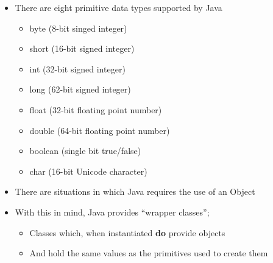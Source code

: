 \documentclass{beamer}
\begin{document}
\begin{frame}

\begin{itemize}
\item There are eight primitive data types supported by Java

\begin{itemize}
\item byte (8-bit singed integer)
\item short (16-bit signed integer)
\item int (32-bit signed integer)
\item long (62-bit signed integer)
\item float (32-bit floating point number)
\item double (64-bit floating point number)
\item boolean (single bit true/false)
\item char (16-bit Unicode character)
\end{itemize}
\end{itemize}

\end{frame}

\begin{frame}[fragile]

\begin{itemize}
\item There are situations in which Java requires the use of an Object
\item With this in mind, Java provides ``wrapper classes'';

\begin{itemize}
\item Classes which, when instantiated \textbf{do} provide objects 
\item And hold the same values as the primitives used to create them
\end{itemize}
\end{itemize}

\end{frame}
\end{document}
